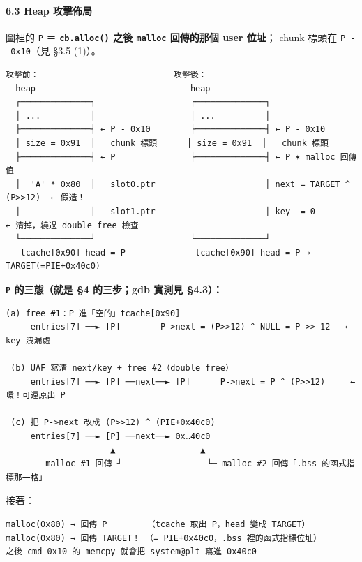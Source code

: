 \documentclass[10pt,a4paper]{article}
\renewenvironment{quote}{%
  \begin{mdframed}[linewidth=0pt,innerleftmargin=0pt,innerrightmargin=0pt,
    innerbottommargin=0pt,innertopmargin=0pt,skipabove=0.55em,skipbelow=0.55em,
    leftmargin=0.9em,rightmargin=0.4em,startcode={\color{quotebar}\vrule width 2.6pt},%
    endcode={}]%
  \itshape\color{black}%
}{%
  \end{mdframed}%
}
\begin{document}
\paragraph{6.3 Heap 攻擊佈局}\label{heap-ux653bux64caux4f48ux5c40}

\begin{quote}
圖裡的 \texttt{P} ＝ \textbf{\texttt{cb.\allowbreak{}alloc()} 之後 \texttt{malloc}
回傳的那個 user 位址}； chunk 標頭在 \texttt{P\ \allowbreak{}-\allowbreak{}\ \allowbreak{}0x10}（見 §3.5
(1)）。
\end{quote}

\begin{Verbatim}[breaklines=true,breakanywhere=true,breakautoindent=false,fontsize=\fontsize{7.0}{9.5}\selectfont]
攻擊前：                           攻擊後：
  heap                               heap
  ┌──────────────┐                   ┌──────────────┐
  │ ...          │                   │ ...          │
  ├──────────────┤ ← P - 0x10        ├──────────────┤ ← P - 0x10
  │ size = 0x91  │   chunk 標頭      │ size = 0x91  │   chunk 標頭
  ├──────────────┤ ← P               ├──────────────┤ ← P ✶ malloc 回傳值
  │  'A' * 0x80  │   slot0.ptr                      │ next = TARGET ^ (P>>12)  ← 假造！
  │              │   slot1.ptr                      │ key  = 0                 ← 清掉，繞過 double free 檢查
  └──────────────┘                   └──────────────┘
   tcache[0x90] head = P              tcache[0x90] head = P → TARGET(=PIE+0x40c0)
\end{Verbatim}

\textbf{\texttt{P} 的三態（就是 §4 的三步；gdb 實測見 §4.3）：}

\begin{Verbatim}[breaklines=true,breakanywhere=true,breakautoindent=false,fontsize=\fontsize{7.0}{9.5}\selectfont]
 (a) free #1：P 進「空的」tcache[0x90]
     entries[7] ──► [P]        P->next = (P>>12) ^ NULL = P >> 12   ← key 洩漏處

 (b) UAF 寫清 next/key + free #2（double free）
     entries[7] ──► [P] ──next──► [P]      P->next = P ^ (P>>12)     ← 環！可還原出 P

 (c) 把 P->next 改成 (P>>12) ^ (PIE+0x40c0)
     entries[7] ──► [P] ──next──► 0x…40c0
                     ▲                 ▲
        malloc #1 回傳 ┘                 └─ malloc #2 回傳「.bss 的函式指標那一格」
\end{Verbatim}

接著：

\begin{Verbatim}[breaklines=true,breakanywhere=true,breakautoindent=false,fontsize=\fontsize{7.0}{9.5}\selectfont]
malloc(0x80) → 回傳 P        （tcache 取出 P，head 變成 TARGET）
malloc(0x80) → 回傳 TARGET！ （= PIE+0x40c0，.bss 裡的函式指標位址）
之後 cmd 0x10 的 memcpy 就會把 system@plt 寫進 0x40c0
\end{Verbatim}
\end{document}
